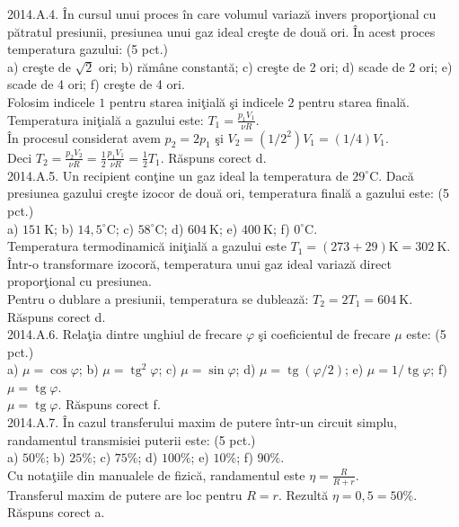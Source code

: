 2014.A.4. În cursul unui proces în care volumul variază invers proporţional cu pătratul presiunii, presiunea unui gaz ideal creşte de două ori. În acest proces temperatura gazului: (5 pct.)\\ a) creşte de $\sqrt{2}$ ori; b) rămâne constantă; c) creşte de 2 ori; d) scade de 2 ori; e) scade de 4 ori; f) creşte de 4 ori.\\ Folosim indicele $1$ pentru starea iniţială şi indicele $2$ pentru starea finală. Temperatura iniţială a gazului este: $T_{1}=\frac{p_{1} V_{1}}{\nu R}$.\\ În procesul considerat avem $p_{2}=2 p_{1}$ şi $V_{2}=\left(1 / 2^{2}\right) V_{1}=(1 / 4) V_{1}$.\\ Deci $T_{2}=\frac{p_{2} V_{2}}{\nu R}=\frac{1}{2} \frac{p_{1} V_{1}}{\nu R}=\frac{1}{2} T_{1}$. Răspuns corect d.\\

2014.A.5. Un recipient conţine un gaz ideal la temperatura de $29^{\circ} \mathrm{C}$. Dacă presiunea gazului creşte izocor de două ori, temperatura finală a gazului este: (5 pct.)\\ a) $151 \mathrm{~K}$; b) $14,5^{\circ} \mathrm{C}$; c) $58^{\circ} \mathrm{C}$; d) $604 \mathrm{~K}$; e) $400 \mathrm{~K}$; f) $0^{\circ} \mathrm{C}$.\\ Temperatura termodinamică iniţială a gazului este $T_{1}=(273+29) \mathrm{K}=302 \mathrm{~K}$. Într-o transformare izocoră, temperatura unui gaz ideal variază direct proporţional cu presiunea.\\ Pentru o dublare a presiunii, temperatura se dublează: $T_{2}=2 T_{1}=604 \mathrm{~K}$. Răspuns corect d.\\

2014.A.6. Relaţia dintre unghiul de frecare $\varphi$ şi coeficientul de frecare $\mu$ este: (5 pct.)\\ a) $\mu=\cos \varphi$; b) $\mu=\operatorname{tg}^{2} \varphi$; c) $\mu=\sin \varphi$; d) $\mu=\operatorname{tg}(\varphi / 2)$; e) $\mu=1 / \operatorname{tg} \varphi$; f) $\mu=\operatorname{tg} \varphi$.\\ $\mu=\operatorname{tg} \varphi$. Răspuns corect f.\\

2014.A.7. În cazul transferului maxim de putere într-un circuit simplu, randamentul transmisiei puterii este: (5 pct.)\\ a) $50 \%$; b) $25 \%$; c) $75 \%$; d) $100 \%$; e) $10 \%$; f) $90 \%$.\\ Cu notaţiile din manualele de fizică, randamentul este $\eta=\frac{R}{R+r}$.\\ Transferul maxim de putere are loc pentru $R=r$. Rezultă $\eta=0,5=50 \%$. Răspuns corect a.\\

